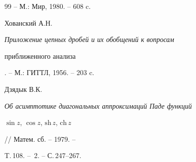 \begin{thebibliography}{99}
-- М.: Мир, 1980. -- 608 c. 




Хованский А.Н. {\em Приложение цепных дробей и их обобщений к вопросам 


приближенного анализа}. -- М.: ГИТТЛ, 1956. -- 203 c. 




Дзядык В.К. {\em Об асимптотике диагональных аппроксимаций Паде функций 


$\sin z$, $\cos z$, $\mathrm{sh}\, z$, $\mathrm{ch}\, z$}


// Матем. сб. -- 1979. --


T.\,108. -- \No\,2. -- С.\,247--267. 





\end{thebibliography}





\vskip 2cm














\label{end}





